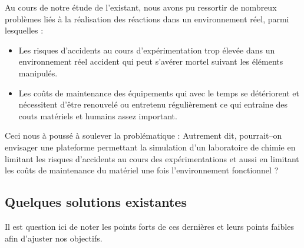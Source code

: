 Au cours de notre étude de l’existant, nous avons pu ressortir de nombreux problèmes liés à la réalisation des réactions dans un environnement réel, parmi lesquelles :

\begin{itemize}
	\item Les risques d’accidents au cours d'expérimentation trop élevée dans un environnement réel accident qui peut s’avérer mortel suivant les éléments manipulés.
	\item Les coûts de maintenance des équipements qui avec le temps se détériorent et nécessitent d’être renouvelé ou entretenu régulièrement ce qui entraine des couts matériels et humains assez important.
\end{itemize}

Ceci nous à poussé à soulever la problématique : \textbf{\og \pb \fg} Autrement dit, pourrait–on envisager une plateforme permettant la simulation d’un laboratoire de chimie en limitant les risques d’accidents au cours des expérimentations et aussi en limitant les coûts de maintenance du matériel une fois l'environnement fonctionnel ?

\subsection{Quelques solutions existantes}

Il est question ici de noter les points forts de ces dernières et leurs points faibles afin d’ajuster nos objectifs.

